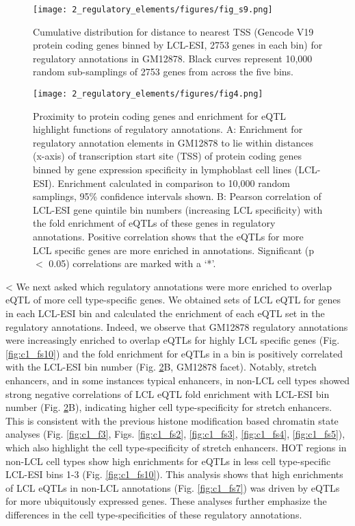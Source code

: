 \begin{figure}
    \centering
    \texttt{[image: 2\_regulatory\_elements/figures/fig\_s9.png]}
    \caption[Cumulative distribution for distance to nearest TSS for regulatory annotations in GM12878]{Cumulative distribution for distance to nearest TSS (Gencode V19 protein coding genes binned by LCL-ESI, 2753 genes in each bin) for regulatory annotations in GM12878. Black curves represent 10,000 random sub-samplings of 2753 genes from across the five bins.}
    \label{fig:c1_fs9}
\end{figure}


\begin{figure}
    \centering
    \texttt{[image: 2\_regulatory\_elements/figures/fig4.png]}
    \caption[Proximity to protein coding genes and enrichment for eQTL highlight functions of regulatory annotations]{Proximity to protein coding genes and enrichment for eQTL highlight functions of regulatory annotations. A: Enrichment for regulatory annotation elements in GM12878 to lie within distances (x-axis) of transcription start site (TSS) of protein coding genes binned by gene expression specificity in lymphoblast cell lines (LCL-ESI). Enrichment calculated in comparison to 10,000 random samplings, 95\% confidence intervals shown. B: Pearson correlation of LCL-ESI gene quintile bin numbers (increasing LCL specificity) with the fold enrichment of eQTLs of these genes in regulatory annotations. Positive correlation shows that the eQTLs for more LCL specific genes are more enriched in annotations. Significant (p $<$ 0.05) correlations are marked with a ‘*’.}
    \label{fig:c1_f4}
\end{figure}
<
We next asked which regulatory annotations were more enriched to overlap eQTL of more cell type-specific genes. We obtained sets of LCL eQTL \cite{gtexconsortiumGeneticEffectsGene2017} for genes in each LCL-ESI bin and calculated the enrichment of each eQTL set in the regulatory annotations. Indeed, we observe that GM12878 regulatory annotations were increasingly enriched to overlap eQTLs for highly LCL specific genes (Fig. \ref{fig:c1_fs10}) and the fold enrichment for eQTLs in a bin is positively correlated with the LCL-ESI bin number (Fig. \ref{fig:c1_f4}B, GM12878 facet). Notably, stretch enhancers, and in some instances typical enhancers, in non-LCL cell types showed strong negative correlations of LCL eQTL fold enrichment with LCL-ESI bin number (Fig. \ref{fig:c1_f4}B), indicating higher cell type-specificity for stretch enhancers. This is consistent with the previous histone modification based chromatin state analyses (Fig. \ref{fig:c1_f3}, Figs. \ref{fig:c1_fs2}, \ref{fig:c1_fs3}, \ref{fig:c1_fs4}, \ref{fig:c1_fs5}), which also highlight the cell type-specificity of stretch enhancers. HOT regions in non-LCL cell types show high enrichments for eQTLs in less cell type-specific LCL-ESI bins 1-3 (Fig. \ref{fig:c1_fs10}). This analysis shows that high enrichments of LCL eQTLs in non-LCL annotations (Fig. \ref{fig:c1_fs7}) was driven by eQTLs for more ubiquitously expressed genes. These analyses further emphasize the differences in the cell type-specificities of these regulatory annotations.\\

